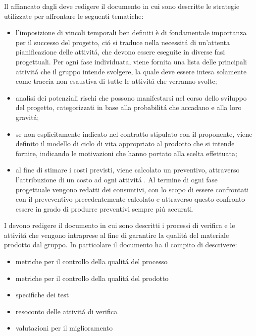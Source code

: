 Il \responsabile{} affiancato dagli \amministratori{} deve redigere il documento \PdPv{} in cui sono descritte le strategie utilizzate per affrontare le seguenti tematiche:

\begin{itemize}
    \item l'imposizione di vincoli temporali ben definiti \`{e} di fondamentale importanza per il successo del progetto, ci\'o si traduce nella necessit\'a di un'attenta pianificazione delle attivit\'a, che devono essere eseguite in diverse fasi progettuali. Per ogni fase individuata, viene fornita una lista delle principali attivit\'a che il gruppo intende svolgere, la quale deve essere intesa solamente come traccia non esaustiva di tutte le attivit\'a che verranno svolte;
    \item analisi dei potenziali rischi che possono manifestarsi nel corso dello sviluppo del progetto, categorizzati in base alla probabilit\'a che accadano e alla loro gravit\'a;
    \item se non esplicitamente indicato nel contratto stipulato con il proponente, viene definito il modello di ciclo di vita appropriato al prodotto che si intende fornire, indicando le motivazioni che hanno portato alla scelta effettuata;
    \item al fine di stimare i costi previsti, viene calcolato un preventivo, attraverso l'attribuzione di un costo ad ogni attivit\'a . Al termine di ogni fase progettuale vengono redatti dei consuntivi, con lo scopo di essere confrontati con il preveventivo precedentemente calcolato e attraverso questo confronto essere in grado di produrre preventivi sempre pi\'u accurati.
\end{itemize}

I \verificatori{} devono redigere il documento \PdQv{} in cui sono descritti i processi di verifica e le attivit\'a che vengono intraprese al fine di garantire la qualit\'a del materiale prodotto dal gruppo. In particolare il documento ha il compito di descrivere:

\begin{itemize}
    \item metriche per il controllo della qualit\'a del processo
    \item metriche per il controllo della qualit\'a del prodotto
    \item specifiche dei test
    \item resoconto delle attivit\'a di verifica
    \item valutazioni per il miglioramento
\end{itemize}
